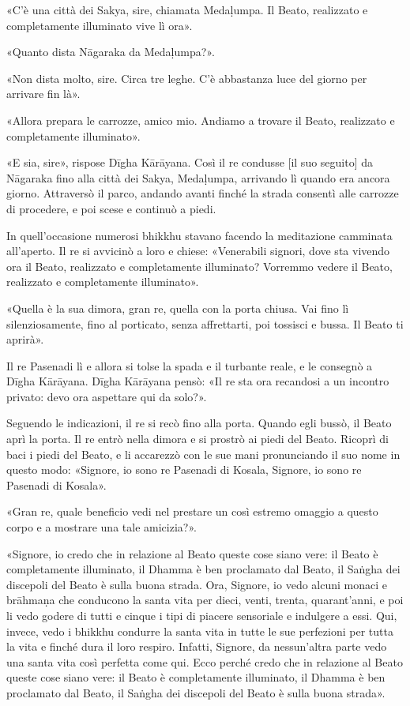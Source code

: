 «C’è una città dei Sakya, sire, chiamata Medaḷumpa. Il Beato, realizzato
e completamente illuminato vive lì ora».


«Quanto dista Nāgaraka da Medaḷumpa?».


«Non dista molto, sire. Circa tre leghe. C’è abbastanza luce del giorno
per arrivare fin là».


«Allora prepara le carrozze, amico mio. Andiamo a trovare il Beato,
realizzato e completamente illuminato».


«E sia, sire», rispose Dīgha Kārāyana. Così il re condusse [il suo
seguito] da Nāgaraka fino alla città dei Sakya, Medaḷumpa, arrivando lì
quando era ancora giorno. Attraversò il parco, andando avanti finché la
strada consentì alle carrozze di procedere, e poi scese e continuò a
piedi.


In quell’occasione numerosi bhikkhu stavano facendo la meditazione
camminata all’aperto. Il re si avvicinò a loro e chiese: «Venerabili
signori, dove sta vivendo ora il Beato, realizzato e completamente
illuminato? Vorremmo vedere il Beato, realizzato e completamente
illuminato».


«Quella è la sua dimora, gran re, quella con la porta chiusa. Vai fino
lì silenziosamente, fino al porticato, senza affrettarti, poi tossisci e
bussa. Il Beato ti aprirà».


Il re Pasenadi lì e allora si tolse la spada e il turbante reale, e le
consegnò a Dīgha Kārāyana. Dīgha Kārāyana pensò: «Il re sta ora
recandosi a un incontro privato: devo ora aspettare qui da solo?».


Seguendo le indicazioni, il re si recò fino alla porta. Quando egli
bussò, il Beato aprì la porta. Il re entrò nella dimora e si prostrò ai
piedi del Beato. Ricoprì di baci i piedi del Beato, e li accarezzò con
le sue mani pronunciando il suo nome in questo modo: «Signore, io sono
re Pasenadi di Kosala, Signore, io sono re Pasenadi di Kosala».


«Gran re, quale beneficio vedi nel prestare un così estremo omaggio a
questo corpo e a mostrare una tale amicizia?».


«Signore, io credo che in relazione al Beato queste cose siano vere: il
Beato è completamente illuminato, il Dhamma è ben proclamato dal Beato,
il Saṅgha dei discepoli del Beato è sulla buona strada. Ora, Signore, io
vedo alcuni monaci e brāhmaṇa che conducono la santa vita per dieci,
venti, trenta, quarant’anni, e poi li vedo godere di tutti e cinque i
tipi di piacere sensoriale e indulgere a essi. Qui, invece, vedo i
bhikkhu condurre la santa vita in tutte le sue perfezioni per tutta la
vita e finché dura il loro respiro. Infatti, Signore, da nessun’altra
parte vedo una santa vita così perfetta come qui. Ecco perché credo che
in relazione al Beato queste cose siano vere: il Beato è completamente
illuminato, il Dhamma è ben proclamato dal Beato, il Saṅgha dei
discepoli del Beato è sulla buona strada».


